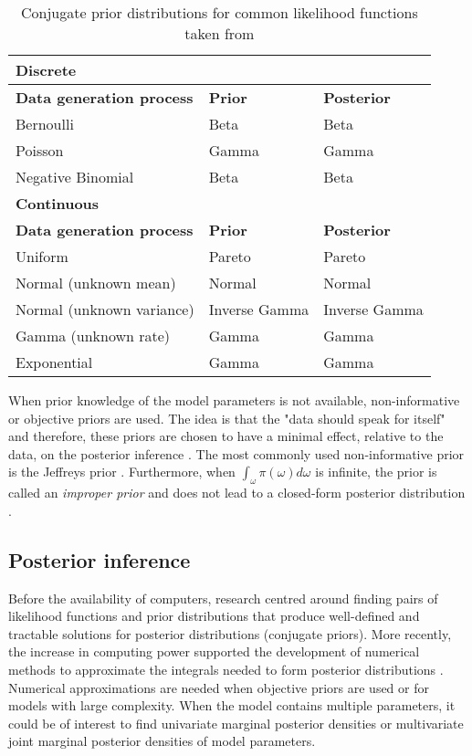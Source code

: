 \begin{table}[hb	]
\centering
\caption{Conjugate prior distributions for common likelihood functions taken from \citep{Fink1997}}
\label{tab0:priors}
\begin{tabular}{l l l}
\toprule
\textbf{Discrete} & &\\
\midrule
\midrule
\textbf{Data generation process} & \textbf{Prior} & \textbf{Posterior} \\ 
\midrule 
Bernoulli & Beta & Beta \\
Poisson & Gamma  & Gamma \\
Negative Binomial & Beta & Beta \\
\midrule
\midrule
\textbf{Continuous} & & \\
\midrule
\midrule
\textbf{Data generation process} & \textbf{Prior} & \textbf{Posterior} \\ 
\midrule
Uniform  & Pareto & Pareto \\ 
Normal (unknown mean) &  Normal  & Normal \\ 
Normal (unknown variance) &  Inverse Gamma  & Inverse Gamma \\ 
Gamma (unknown rate) &  Gamma  & Gamma \\ 
Exponential &  Gamma  & Gamma \\ 
\bottomrule
\end{tabular}
\end{table} 

When prior knowledge of the model parameters is not available, non-informative or objective priors are used. The idea is that the "data should speak for itself" and therefore, these priors are chosen to have a minimal effect, relative to the data, on the posterior inference \citep{Bernardo2000}. The most commonly used non-informative prior is the Jeffreys prior \citep{Jeffreys1946}. Furthermore, when $\int_\omega\pi(\omega)d\omega$ is infinite, the prior is called an \emph{improper prior} and does not lead to a closed-form posterior distribution \citep{Bernardo2003}.

\subsection{Posterior inference} \label{sec0:posterior_inference}

Before the availability of computers, research centred around finding pairs of likelihood functions and prior distributions that produce well-defined and tractable solutions for posterior distributions (conjugate priors). More recently, the increase in computing power supported the development of numerical methods to approximate the integrals needed to form posterior distributions \citep{Fink1997}. Numerical approximations are needed when objective priors are used or for models with large complexity. When the model contains multiple parameters, it could be of interest to find univariate marginal posterior densities or multivariate joint marginal posterior densities of model parameters.\\

